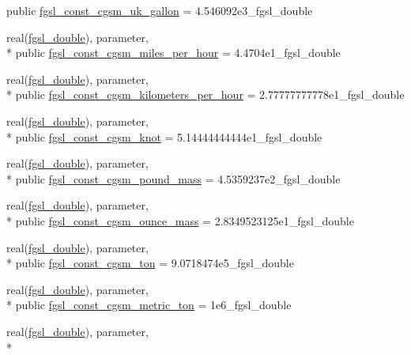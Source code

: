 \begin{DoxyCompactItemize}
public \hyperlink{classfgsl_aaa815df0586e577834ad13d9b6dd8218}{fgsl\-\_\-const\-\_\-cgsm\-\_\-uk\-\_\-gallon} = 4.\-546092e3\-\_\-fgsl\-\_\-double
\item 
real(\hyperlink{classfgsl_a9af5113378e0f000eb479d3f90196ddf}{fgsl\-\_\-double}), parameter, \\*
public \hyperlink{classfgsl_a021d66524bb3e4b9305ce5399f11f2ec}{fgsl\-\_\-const\-\_\-cgsm\-\_\-miles\-\_\-per\-\_\-hour} = 4.\-4704e1\-\_\-fgsl\-\_\-double
\item 
real(\hyperlink{classfgsl_a9af5113378e0f000eb479d3f90196ddf}{fgsl\-\_\-double}), parameter, \\*
public \hyperlink{classfgsl_a302d497108c596ed552f90c728af3002}{fgsl\-\_\-const\-\_\-cgsm\-\_\-kilometers\-\_\-per\-\_\-hour} = 2.\-77777777778e1\-\_\-fgsl\-\_\-double
\item 
real(\hyperlink{classfgsl_a9af5113378e0f000eb479d3f90196ddf}{fgsl\-\_\-double}), parameter, \\*
public \hyperlink{classfgsl_a7b637a368f16bed373b7ff18193b8417}{fgsl\-\_\-const\-\_\-cgsm\-\_\-knot} = 5.\-14444444444e1\-\_\-fgsl\-\_\-double
\item 
real(\hyperlink{classfgsl_a9af5113378e0f000eb479d3f90196ddf}{fgsl\-\_\-double}), parameter, \\*
public \hyperlink{classfgsl_ae6b5172d0dcea9b11e99852be3ec5f1a}{fgsl\-\_\-const\-\_\-cgsm\-\_\-pound\-\_\-mass} = 4.\-5359237e2\-\_\-fgsl\-\_\-double
\item 
real(\hyperlink{classfgsl_a9af5113378e0f000eb479d3f90196ddf}{fgsl\-\_\-double}), parameter, \\*
public \hyperlink{classfgsl_aef077a68e7fdd2fe6ec932a7f3c1e8bc}{fgsl\-\_\-const\-\_\-cgsm\-\_\-ounce\-\_\-mass} = 2.\-8349523125e1\-\_\-fgsl\-\_\-double
\item 
real(\hyperlink{classfgsl_a9af5113378e0f000eb479d3f90196ddf}{fgsl\-\_\-double}), parameter, \\*
public \hyperlink{classfgsl_a4f163ec06fee37b45bf96990c803601e}{fgsl\-\_\-const\-\_\-cgsm\-\_\-ton} = 9.\-0718474e5\-\_\-fgsl\-\_\-double
\item 
real(\hyperlink{classfgsl_a9af5113378e0f000eb479d3f90196ddf}{fgsl\-\_\-double}), parameter, \\*
public \hyperlink{classfgsl_a6d4725a1ee32c2bf1dcd4aa1d2e00908}{fgsl\-\_\-const\-\_\-cgsm\-\_\-metric\-\_\-ton} = 1e6\-\_\-fgsl\-\_\-double
\item 
real(\hyperlink{classfgsl_a9af5113378e0f000eb479d3f90196ddf}{fgsl\-\_\-double}), parameter, \\*

\end{DoxyCompactItemize}
